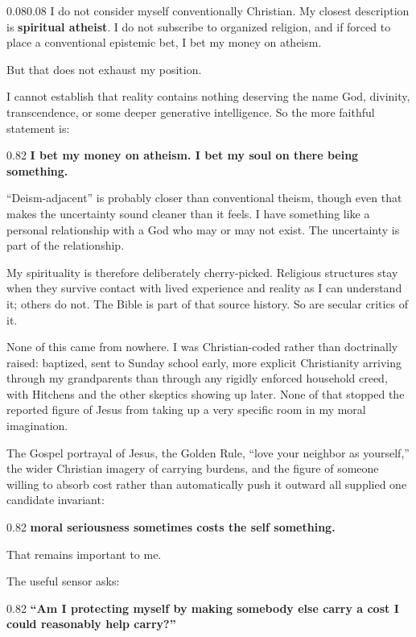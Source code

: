 \documentclass[10pt,letterpaper]{article}
\newenvironment{paperbody}
  {\begin{adjustwidth}{0.08\textwidth}{0.08\textwidth}\justifying}
  {\par\end{adjustwidth}}
\newenvironment{thesisbox}
  {\Needspace{3.5\baselineskip}\par\vspace{0.32em}\begin{center}\begingroup
   \begin{lrbox}{\thesisboxsave}\begin{varwidth}{0.82\linewidth}
   \normalsize\rmfamily\bfseries\upshape\RaggedRight}
  {\end{varwidth}\end{lrbox}\fbox{\usebox{\thesisboxsave}}
   \endgroup\end{center}\vspace{0.32em}}
\begin{document}
\begin{paperbody}
I do not consider myself conventionally Christian. My closest
description is \textbf{spiritual atheist}. I do not subscribe to
organized religion, and if forced to place a conventional epistemic bet,
I bet my money on atheism.

But that does not exhaust my position.

I cannot establish that reality contains nothing deserving the name God,
divinity, transcendence, or some deeper generative intelligence. So the
more faithful statement is:

\begin{thesisbox}
I bet my money on atheism. I bet my soul on there being
something.
\end{thesisbox}

``Deism-adjacent'' is probably closer than conventional theism, though
even that makes the uncertainty sound cleaner than it feels. I have
something like a personal relationship with a God who may or may not
exist. The uncertainty is part of the relationship.

My spirituality is therefore deliberately cherry-picked. Religious
structures stay when they survive contact with lived experience and
reality as I can understand it; others do not. The Bible is part of that
source history. So are secular critics of it.

None of this came from nowhere. I was Christian-coded rather than
doctrinally raised: baptized, sent to Sunday school early, more explicit
Christianity arriving through my grandparents than through any rigidly
enforced household creed, with Hitchens and the other skeptics showing up
later. None of that stopped the reported figure of Jesus from taking up a
very specific room in my moral imagination.

The Gospel portrayal of Jesus, the Golden Rule, ``love your neighbor as
yourself,'' the wider Christian imagery of carrying burdens, and the
figure of someone willing to absorb cost rather than automatically push
it outward all supplied one candidate invariant:

\begin{thesisbox}
moral seriousness sometimes costs the self something.
\end{thesisbox}

That remains important to me.

The useful sensor asks:

\begin{thesisbox}
``Am I protecting myself by making somebody else carry a cost I
could reasonably help carry?''
\end{thesisbox}


\end{paperbody}
\end{document}
